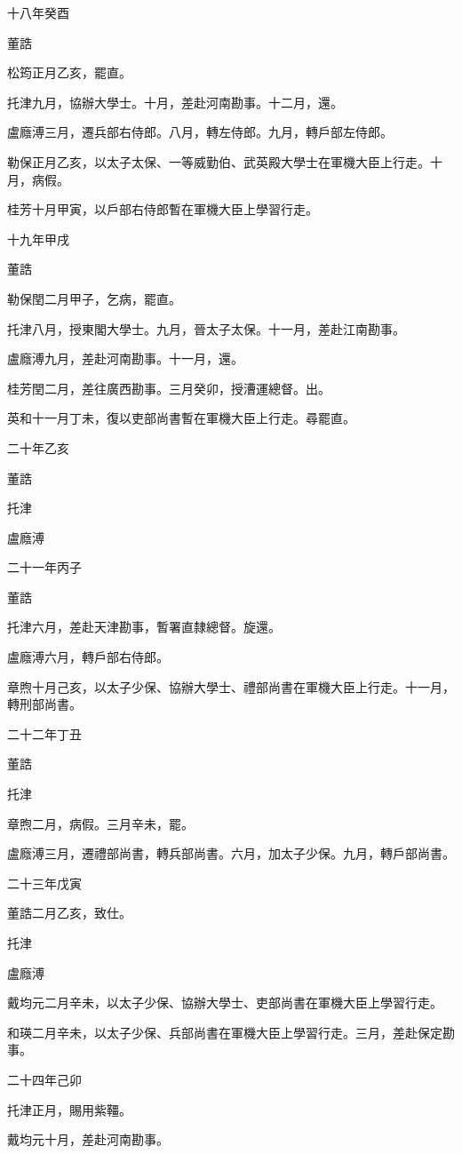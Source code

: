 \begin{pinyinscope}
十八年癸酉

董誥

松筠正月乙亥，罷直。

托津九月，協辦大學士。十月，差赴河南勘事。十二月，還。

盧廕溥三月，遷兵部右侍郎。八月，轉左侍郎。九月，轉戶部左侍郎。

勒保正月乙亥，以太子太保、一等威勤伯、武英殿大學士在軍機大臣上行走。十月，病假。

桂芳十月甲寅，以戶部右侍郎暫在軍機大臣上學習行走。

十九年甲戌

董誥

勒保閏二月甲子，乞病，罷直。

托津八月，授東閣大學士。九月，晉太子太保。十一月，差赴江南勘事。

盧廕溥九月，差赴河南勘事。十一月，還。

桂芳閏二月，差往廣西勘事。三月癸卯，授漕運總督。出。

英和十一月丁未，復以吏部尚書暫在軍機大臣上行走。尋罷直。

二十年乙亥

董誥

托津

盧廕溥

二十一年丙子

董誥

托津六月，差赴天津勘事，暫署直隸總督。旋還。

盧廕溥六月，轉戶部右侍郎。

章煦十月己亥，以太子少保、協辦大學士、禮部尚書在軍機大臣上行走。十一月，轉刑部尚書。

二十二年丁丑

董誥

托津

章煦二月，病假。三月辛未，罷。

盧廕溥三月，遷禮部尚書，轉兵部尚書。六月，加太子少保。九月，轉戶部尚書。

二十三年戊寅

董誥二月乙亥，致仕。

托津

盧廕溥

戴均元二月辛未，以太子少保、協辦大學士、吏部尚書在軍機大臣上學習行走。

和瑛二月辛未，以太子少保、兵部尚書在軍機大臣上學習行走。三月，差赴保定勘事。

二十四年己卯

托津正月，賜用紫韁。

戴均元十月，差赴河南勘事。


\end{pinyinscope}
